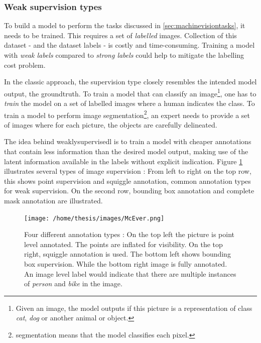 \subsubsection{Weak supervision types\label{sec:weak_supervision}}
\par{
    To build a model to perform the tasks discussed in \ref{sec:machinevisiontasks}, it needs to be trained.
    This requires a set of \textit{labelled} images.
    Collection of this dataset - and the dataset labels - is costly and time-consuming. 
    Training a model with \textit{weak labels} compared to \textit{strong labels} could help to mitigate the labelling cost problem.
}
\par{
    In the classic approach, the supervision type closely resembles the intended model output, the \Gls{groundtruth}.
    To train a model that can classify an image\footnote{Given an image, the model outputs if this picture is a representation of class \textit{cat}, \textit{dog} or another animal or object. }, 
    one has to \textit{train} the model on a set of labelled images where a human indicates the class.
    To train a model to perform image segmentation\footnote{segmentation means that the model classifies each pixel.}, an expert needs to provide a set of images where for each picture, the objects are carefully delineated.  
}
\par{
    The idea behind \Gls{weaklysupervisedl} is to train a model with cheaper annotations that contain less information than the desired model output, 
    making use of the latent information available in the labels without explicit indication.
    Figure \ref{fig:ImageLabelTypes} illustrates several types of image supervision : 
    From left to right on the top row, this shows point supervision and squiggle annotation, common annotation types for weak supervision.
    On the second row, bounding box annotation and complete mask annotation are illustrated.
}

\begin{figure}
    \centering
    \texttt{[image: /home/thesis/images/McEver.png]}
    \caption{Four different annotation types \cite{McEver2020}: 
    On the top left the picture is point level annotated. The points are inflated for visibility.
    On the top right, squiggle annotation is used.
    The bottom left shows bounding box supervision.
    While the bottom right image is fully annotated.
    An image level label would indicate that there are multiple instances of \textit{person} and \textit{bike} in the image.
    \label{fig:ImageLabelTypes}}
\end{figure}

